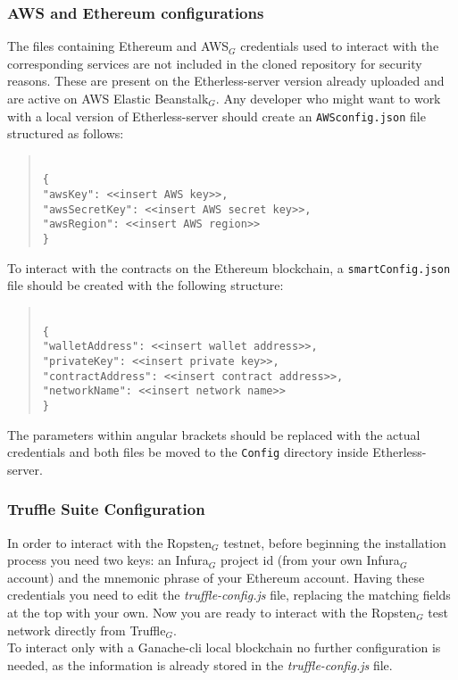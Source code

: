 \subsubsection{AWS and Ethereum configurations}
The files containing Ethereum and AWS$_{G}$ credentials used to interact with the corresponding services are not included in the cloned repository for security reasons. These are present on the Etherless-server version already uploaded and are active on AWS Elastic Beanstalk$_{G}$.
Any developer who might want to work with a local version of Etherless-server should create an \texttt{AWSconfig.json} file structured as follows:
\begin{quote}
\texttt{ \\
	\{\\
		"awsKey": <<insert AWS key>>, \\
		"awsSecretKey": <<insert AWS secret key>>, \\
		"awsRegion": <<insert AWS region>> \\
	\}\\
}
\end{quote}
To interact with the contracts on the Ethereum blockchain, a \texttt{smartConfig.json} file should be created with the following structure:
\begin{quote}
\texttt{ \\
	\{\\
	"walletAddress": <<insert wallet address>>, \\
	"privateKey": <<insert private key>>, \\
	"contractAddress": <<insert contract address>>, \\
	"networkName": <<insert network name>> \\
	\}\\
}
\end{quote}
The parameters within angular brackets should be replaced with the actual credentials and both files be moved to the \texttt{Config} directory inside Etherless-server.
\subsubsection{Truffle Suite Configuration}
	In order to interact with the Ropsten$_{G}$ testnet, before beginning the installation process you need two keys: an Infura$_{G}$ project id (from your own Infura$_{G}$ account) and the mnemonic phrase of your Ethereum account. Having these credentials you need to edit the \textit{truffle-config.js} file, replacing the matching fields at the top with your own. Now you are ready to interact with the Ropsten$_{G}$ test network directly from Truffle$_{G}$.\\
	To interact only with a Ganache-cli local blockchain no further configuration is needed, as the information is already stored in the \textit{truffle-config.js} file.
